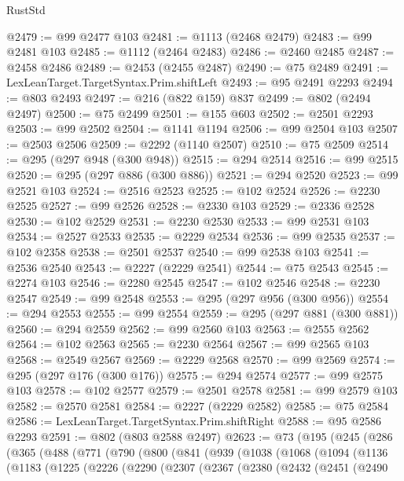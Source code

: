 \begin{lexlean}{RustStd}
\begin{coremodule}
{\begin{coremodule}
{{{{{{{{{{{{{{{{{{{{{{{{{{{{{{{{{@2479 := @99 @2477 @103
@2481 := @1113 (@2468 @2479)
@2483 := @99 @2481 @103
@2485 := @1112 (@2464 @2483)
@2486 := @2460 @2485
@2487 := @2458 @2486
@2489 := @2453 (@2455 @2487)
@2490 := @75 @2489
@2491 := LexLeanTarget.TargetSyntax.Prim.shiftLeft
@2493 := @95 @2491 @2293
@2494 := @803 @2493
@2497 := @216 (@822 @159) @837
@2499 := @802 (@2494 @2497)
@2500 := @75 @2499
@2501 := @155 @603
@2502 := @2501 @2293
@2503 := @99 @2502
@2504 := @1141 @1194
@2506 := @99 @2504 @103
@2507 := @2503 @2506
@2509 := @2292 (@1140 @2507)
@2510 := @75 @2509
@2514 := @295 (@297 @948 (@300 @948))
@2515 := @294 @2514
@2516 := @99 @2515
@2520 := @295 (@297 @886 (@300 @886))
@2521 := @294 @2520
@2523 := @99 @2521 @103
@2524 := @2516 @2523
@2525 := @102 @2524
@2526 := @2230 @2525
@2527 := @99 @2526
@2528 := @2330 @103
@2529 := @2336 @2528
@2530 := @102 @2529
@2531 := @2230 @2530
@2533 := @99 @2531 @103
@2534 := @2527 @2533
@2535 := @2229 @2534
@2536 := @99 @2535
@2537 := @102 @2358
@2538 := @2501 @2537
@2540 := @99 @2538 @103
@2541 := @2536 @2540
@2543 := @2227 (@2229 @2541)
@2544 := @75 @2543
@2545 := @2274 @103
@2546 := @2280 @2545
@2547 := @102 @2546
@2548 := @2230 @2547
@2549 := @99 @2548
@2553 := @295 (@297 @956 (@300 @956))
@2554 := @294 @2553
@2555 := @99 @2554
@2559 := @295 (@297 @881 (@300 @881))
@2560 := @294 @2559
@2562 := @99 @2560 @103
@2563 := @2555 @2562
@2564 := @102 @2563
@2565 := @2230 @2564
@2567 := @99 @2565 @103
@2568 := @2549 @2567
@2569 := @2229 @2568
@2570 := @99 @2569
@2574 := @295 (@297 @176 (@300 @176))
@2575 := @294 @2574
@2577 := @99 @2575 @103
@2578 := @102 @2577
@2579 := @2501 @2578
@2581 := @99 @2579 @103
@2582 := @2570 @2581
@2584 := @2227 (@2229 @2582)
@2585 := @75 @2584
@2586 := LexLeanTarget.TargetSyntax.Prim.shiftRight
@2588 := @95 @2586 @2293
@2591 := @802 (@803 @2588 @2497)
@2623 := @73
    (@195
      (@245
        (@286
          (@365
            (@488
              (@771
                (@790
                  (@800
                    (@841
                      (@939
                        (@1038
                          (@1068
                            (@1094
                              (@1136
                                (@1183
                                  (@1225
                                    (@2226
                                      (@2290
                                        (@2307
                                          (@2367
                                            (@2380
                                              (@2432
                                                (@2451
                                                  (@2490
}}}}}}}}}}}}}}}}}}}}}}}}}}}}}}}}}
\end{coremodule}}
\end{coremodule}
\end{lexlean}
